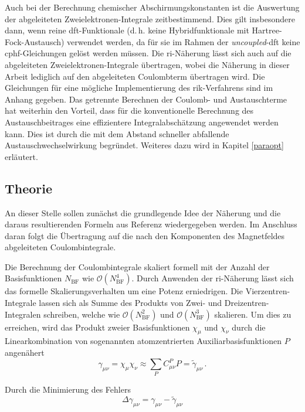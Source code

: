 Auch bei der Berechnung chemischer Abschirmungskonstanten ist die Auswertung der abgeleiteten Zweielektronen-Integrale zeitbestimmend. Dies gilt insbesondere dann, wenn reine \ac{dft}-Funktionale (d.\,h. keine Hybridfunktionale mit Hartree-Fock-Austausch) verwendet werden, da für sie im Rahmen der \textit{uncoupled}-\ac{dft} keine \ac{cphf}-Gleichungen gelöst werden müssen. Die \ac{ri}-Näherung lässt sich auch auf die abgeleiteten Zweielektronen-Integrale übertragen, wobei die Näherung in dieser Arbeit lediglich auf den abgeleiteten Coulombterm übertragen wird. Die Gleichungen für eine mögliche Implementierung des \acs{rik}-Verfahrens sind im Anhang gegeben. Das getrennte Berechnen der Coulomb- und Austauschterme hat weiterhin den Vorteil, dass für die konventionelle Berechnung des Austauschbeitrages eine effizientere Integralabschätzung angewendet werden kann. Dies ist durch die mit dem Abstand schneller abfallende Austauschwechselwirkung begründet. Weiteres dazu wird in Kapitel \ref{paraopt} erläutert. 
	\subsection{Theorie}
	An dieser Stelle sollen zunächst die grundlegende Idee der Näherung und die daraus resultierenden Formeln aus Referenz \cite{vahtras1993integral} wiedergegeben werden. Im Anschluss daran folgt die Übertragung auf die nach den Komponenten des Magnetfeldes abgeleiteten Coulombintegrale. 
	
	Die Berechnung der Coulombintegrale skaliert formell mit der Anzahl der Basisfunktionen $N_\textrm{BF}$ wie $\mathcal{O}(N_\textrm{BF}^4)$. Durch Anwenden der \ac{ri}-Näherung lässt sich das formelle Skalierungsverhalten um eine Potenz erniedrigen. Die Vierzentren-Integrale lassen sich als Summe des Produkts von Zwei- und Dreizentren-Integralen schreiben, welche wie $\mathcal{O}(N_\textrm{BF}^2)$ und $\mathcal{O}(N_\textrm{BF}^3)$ skalieren. Um dies zu erreichen, wird das Produkt zweier Basisfunktionen $\chi_\mu$ und $\chi_\nu$ durch die Linearkombination von sogenannten atomzentrierten Auxiliarbasisfunktionen $P$ angenähert	
	\begin{equation}
	\gamma_{\mu\nu}=\chi_\mu\chi_\nu\approx\sum_PC^P_{\mu\nu}P=\tilde{\gamma}_{\mu\nu}\, .
	\end{equation}
	
	Durch die Minimierung des Fehlers
	\begin{equation}
	\Delta\gamma_{\mu\nu} = \gamma_{\mu\nu}-\tilde{\gamma}_{\mu\nu}
	\end{equation}
	
